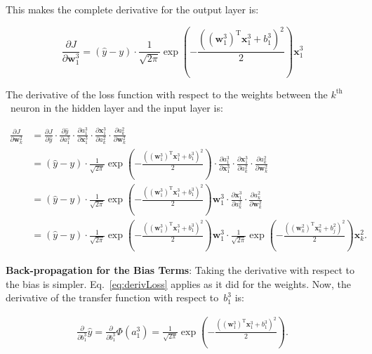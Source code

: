 \documentclass{report}
\newcommand{\w}{\mathbf{w}}
\newcommand{\xvec}{\mathbf{x}}
\newcommand{\yhat}{\hat{y}}
\newcommand{\T}{\text{T}}
\begin{document}
  This makes the complete derivative for the output layer is:
  
  \begin{equation}
    \frac{\partial J}{\partial \w_{1}^{3}} = \boxed{\left( \yhat - y \right) \cdot \frac{1}{\sqrt{2\pi}} \exp\left( -\frac{\left(\left(\w_{1}^{3}\right)^\T\xvec_{1}^{3}+b_{1}^{3}\right)^{2}}{2} \right)\xvec_{1}^{3}} \label{eq:outputLayerDerivative}
  \end{equation}
    
  The derivative of the loss function with respect to the weights between the $k^{\text{th}}$~neuron in the hidden layer and the input layer is:
  
  \begin{align}
    \frac{\partial J}{\partial \w_{k}^{2}} &= \frac{\partial J}{\partial \yhat} \cdot \frac{\partial \yhat}{\partial a_{1}^{3}} \cdot \frac{\partial a_{1}^{3}}{\partial \xvec_{1}^{3}} \cdot \frac{\partial \xvec_{1}^{3}}{\partial a_{k}^{2}} \cdot \frac{\partial a_{k}^{2}}{\partial \w_{k}^{2}}\label{eq:hiddenLayerChainRule}\\
      &=\left(\yhat - y\right) \cdot \frac{1}{\sqrt{2\pi}} \exp\left( -\frac{\left(\left(\w_{1}^{3}\right)^\T\xvec_{1}^{3}+b_{1}^{3}\right)^{2}}{2} \right) \cdot \frac{\partial a_{1}^{3}}{\partial \xvec_{1}^{3}} \cdot \frac{\partial \xvec_{1}^{3}}{\partial a_{k}^{2}} \cdot \frac{\partial a_{k}^{2}}{\partial \w_{k}^{2}}\\
      &=\left(\yhat - y\right) \cdot \frac{1}{\sqrt{2\pi}} \exp\left( -\frac{\left(\left(\w_{1}^{3}\right)^\T\xvec_{1}^{3}+b_{1}^{3}\right)^{2}}{2} \right)\w_{1}^{3} \cdot \frac{\partial \xvec_{1}^{3}}{\partial a_{k}^{2}} \cdot \frac{\partial a_{k}^{2}}{\partial \w_{k}^{2}}\\
      &=\boxed{\left(\yhat - y\right) \cdot \frac{1}{\sqrt{2\pi}} \exp\left( -\frac{\left(\left(\w_{1}^{3}\right)^\T\xvec_{1}^{3}+b_{1}^{3}\right)^{2}}{2} \right)\w_{1}^{3} \cdot \frac{1}{\sqrt{2\pi}} \exp\left( -\frac{\left(\left(\w_{k}^{2}\right)^\T\xvec_{k}^{2}+b_{j}^{2}\right)^{2}}{2} \right)\xvec_{k}^{2}}
      \textrm{.}
  \end{align}

  
  \textbf{Back-propagation for the Bias Terms}: Taking the derivative with respect to the bias is simpler.  Eq.~\ref{eq:derivLoss} applies as it did for the weights.  Now, the derivative of the transfer function with respect to~$b_{1}^{3}$ is:
  
  \begin{align}
    \frac{\partial}{\partial b_{1}^{3}} \yhat = \frac{\partial}{\partial b_{1}^{3}}\Phi(a_{1}^{3})=\frac{1}{\sqrt{2\pi}} \exp\left( -\frac{\left(\left(\w_{1}^{3}\right)^\T\xvec_{1}^{3}+b_{1}^{3}\right)^{2}}{2} \right)\textrm{.}
  \end{align}
    
\end{document}
